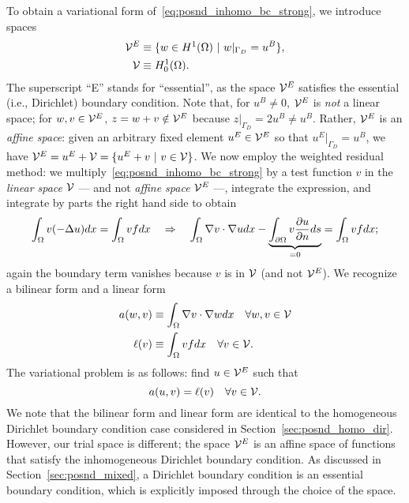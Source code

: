 To obtain a variational form of~\eqref{eq:posnd_inhomo_bc_strong}, we introduce spaces
\begin{align*}
  \mathcal{V}^E &\equiv \{ w \in H^1(\Omega) \ | \ w|_{\Gamma_D} = u^B \}, \\
  \mathcal{V} &\equiv H^1_0(\Omega).
\end{align*}
The superscript ``E'' stands for ``essential'', as the space $\mathcal{V}^E$ satisfies the essential (i.e., Dirichlet) boundary condition. Note that, for $u^B \neq 0$, $\mathcal{V}^E$ is \emph{not} a linear space; for $w,v \in \mathcal{V}^E$, $z = w + v \notin \mathcal{V}^E$ because $z|_{\Gamma_D} = 2 u^B \neq u^B$. Rather, $\mathcal{V}^E$ is an \emph{affine space}: given an arbitrary fixed element $u^E \in \mathcal{V}^E$ so that $u^E|_{\Gamma_D} = u^B$, we have $\calV^E = u^E + \calV = \{ u^E + v \ | \ v \in \calV \}$. We now employ the weighted residual method: we multiply~\eqref{eq:posnd_inhomo_bc_strong} by a test function $v$ in the \emph{linear space} $\mathcal{V}$ --- and not \emph{affine space} $\mathcal{V}^E$ ---, integrate the expression, and integrate by parts the right hand side to obtain
\begin{equation*}
  \int_{\Omega} v(-\Delta u) dx = \int_\Omega vf dx
  \quad \Rightarrow \quad
  \int_\Omega \nabla v \cdot \nabla u dx - \underbrace{ \int_{\partial \Omega} v \frac{\partial u}{\partial n} ds }_{= 0}
  = \int_\Omega v f dx;
\end{equation*}
again the boundary term vanishes because $v$ is in $\mathcal{V}$ (and not $\mathcal{V}^E$). 
We recognize a bilinear form and a linear form
\begin{align*}
  a(w,v) &\equiv \int_\Omega \nabla v \cdot \nabla w dx \quad \forall w,v \in \mathcal{V} \\
  \ell(v) &\equiv \int_\Omega vf dx \quad \forall v \in \mathcal{V}.
\end{align*}
The variational problem is as follows: find $u \in \mathcal{V}^E$ such that
\begin{equation}
  a(u,v) = \ell(v) \quad \forall v \in \mathcal{V}.
  \label{eq:posnd_inhomo_bc_var}
\end{equation}
We note that the bilinear form and linear form are identical to the homogeneous Dirichlet boundary condition case considered in Section~\ref{sec:posnd_homo_dir}.  However, our trial space is different; the space $\mathcal{V}^E$ is an affine space of functions that satisfy the inhomogeneous Dirichlet boundary condition.  As discussed in Section~\ref{sec:posnd_mixed}, a Dirichlet boundary condition is an essential boundary condition, which is explicitly imposed through the choice of the space. %

